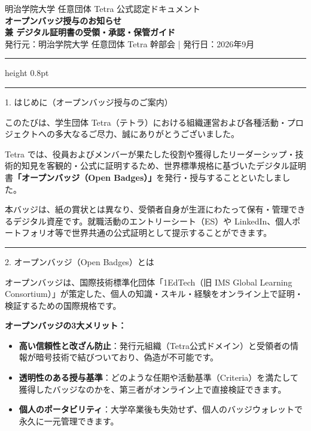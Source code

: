 \documentclass[10.5pt,a4paper]{ltjsarticle}
\newcommand{\mysection}[1]{%
    \vspace{2mm}%
    {\fontsize{12pt}{14pt}\selectfont\bfseries\color{TetraDarkBlue}%
    \rule[-2pt]{3pt}{12pt}\hspace{5pt}#1}%
    \vspace{1.5mm}%
}
\begin{document}

\begin{center}
    {\fontsize{9.5pt}{11pt}\selectfont\color{TextSecondary} 明治学院大学 任意団体 Tetra 公式認定ドキュメント} \\[1.5mm]
    {\fontsize{17pt}{20pt}\selectfont\bfseries\color{TetraDarkBlue} オープンバッジ授与のお知らせ} \\[1mm]
    {\fontsize{12.5pt}{15pt}\selectfont\bfseries\color{TextDark} 兼 デジタル証明書の受領・承認・保管ガイド} \\[1.5mm]
    {\fontsize{9pt}{11pt}\selectfont\color{TextSecondary} 発行元：明治学院大学 任意団体 Tetra 幹部会 \quad | \quad 発行日：2026年9月}
\end{center}

\vspace{0.5mm}
\hrule height 0.8pt \relax
\vspace{1.5mm}

\mysection{1. はじめに（オープンバッジ授与のご案内）}

このたびは、学生団体 Tetra（テトラ）における組織運営および各種活動・プロジェクトへの多大なるご尽力、誠にありがとうございました。

Tetra では、役員およびメンバーが果たした役割や獲得したリーダーシップ・技術的知見を客観的・公式に証明するため、世界標準規格に基づいたデジタル証明書\textbf{「オープンバッジ（Open Badges）」}を発行・授与することといたしました。

本バッジは、紙の賞状とは異なり、受領者自身が生涯にわたって保有・管理できるデジタル資産です。就職活動のエントリーシート（ES）や LinkedIn、個人ポートフォリオ等で世界共通の公式証明として提示することができます。

\mysection{2. オープンバッジ（Open Badges）とは}

オープンバッジは、国際技術標準化団体「1EdTech（旧 IMS Global Learning Consortium）」が策定した、個人の知識・スキル・経験をオンライン上で証明・検証するための国際規格です。

\begin{infoframe}
    \textbf{オープンバッジの3大メリット：}
    \begin{itemize}[leftmargin=14pt, itemsep=1.5pt, topsep=1.5pt]
        \item \textbf{高い信頼性と改ざん防止}：発行元組織（Tetra公式ドメイン）と受領者の情報が暗号技術で結びついており、偽造が不可能です。
        \item \textbf{透明性のある授与基準}：どのような任期や活動基準（Criteria）を満たして獲得したバッジなのかを、第三者がオンライン上で直接検証できます。
        \item \textbf{個人のポータビリティ}：大学卒業後も失効せず、個人のバッジウォレットで永久に一元管理できます。
    \end{itemize}
\end{infoframe}
\end{document}
